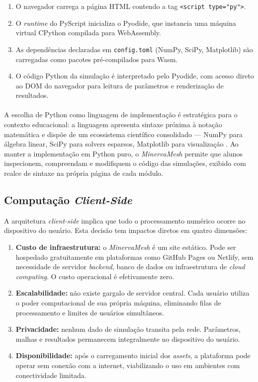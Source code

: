\begin{enumerate}
    \item O navegador carrega a página HTML contendo a tag \texttt{<script type="py">}.
    \item O \textit{runtime} do PyScript inicializa o Pyodide, que instancia uma máquina virtual CPython compilada para WebAssembly.
    \item As dependências declaradas em \texttt{config.toml} (NumPy, SciPy, Matplotlib) são carregadas como pacotes pré-compilados para Wasm.
    \item O código Python da simulação é interpretado pelo Pyodide, com acesso direto ao DOM do navegador para leitura de parâmetros e renderização de resultados.
\end{enumerate}

\paragraph{}A escolha de Python como linguagem de implementação é estratégica para o contexto educacional: a linguagem apresenta sintaxe próxima à notação matemática e dispõe de um ecossistema científico consolidado --- NumPy para álgebra linear, SciPy para solvers esparsos, Matplotlib para visualização \cite{Harris2020}. Ao manter a implementação em Python puro, o \textit{MinervaMesh} permite que alunos inspecionem, compreendam e modifiquem o código das simulações, exibido com realce de sintaxe na própria página de cada módulo.

\subsection{Computação \textit{Client-Side}}
\label{sec:client_side}

A arquitetura \textit{client-side} implica que todo o processamento numérico ocorre no dispositivo do usuário. Esta decisão tem impactos diretos em quatro dimensões:

\begin{enumerate}
    \item \textbf{Custo de infraestrutura:} o \textit{MinervaMesh} é um site estático. Pode ser hospedado gratuitamente em plataformas como GitHub Pages ou Netlify, sem necessidade de servidor \textit{backend}, banco de dados ou infraestrutura de \textit{cloud computing}. O custo operacional é efetivamente zero.
    \item \textbf{Escalabilidade:} não existe gargalo de servidor central. Cada usuário utiliza o poder computacional de sua própria máquina, eliminando filas de processamento e limites de usuários simultâneos.
    \item \textbf{Privacidade:} nenhum dado de simulação transita pela rede. Parâmetros, malhas e resultados permanecem integralmente no dispositivo do usuário.
    \item \textbf{Disponibilidade:} após o carregamento inicial dos \textit{assets}, a plataforma pode operar sem conexão com a internet, viabilizando o uso em ambientes com conectividade limitada.
\end{enumerate}

